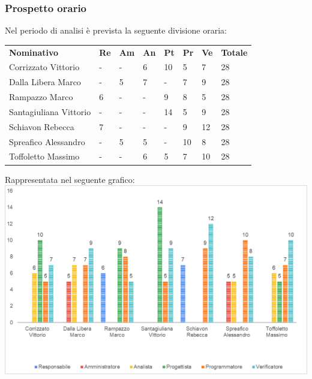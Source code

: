	\subsubsection{Prospetto orario}
	Nel periodo di analisi è prevista la seguente divisione oraria:
	\begin{longtable} {				
		>{}p{40mm}  
		>{}p{8mm}
		>{}p{8mm}
		>{}p{8mm}
		>{}p{8mm}
		>{}p{8mm}
		>{}p{8mm}
		>{}p{12mm}				
	}			
	\rowcolor{gray!50}
	\textbf{Nominativo} & \textbf{Re} & \textbf{Am} & \textbf{An} & \textbf{Pt} & \textbf{Pr} & \textbf{Ve} & \textbf{Totale}	\TBstrut \\ [2mm]
	Corrizzato Vittorio & - & - & 6 & 10 & 5 & 7 & 28 \TBstrut \\ [2mm]
	Dalla Libera Marco & - & 5 & 7 & - & 7 & 9 & 28 \TBstrut \\ [2mm]
	Rampazzo Marco & 6 & - & - & 9 & 8 & 5 & 28 \TBstrut \\ [2mm]
	Santagiuliana Vittorio & - & - & - & 14 & 5 & 9 & 28 \TBstrut \\ [2mm]
	Schiavon Rebecca & 7 & - & - & - & 9 & 12 & 28 \TBstrut \\ [2mm]
	Spreafico Alessandro & - & 5 & 5 & - & 10 & 8 & 28 \TBstrut \\ [2mm]
	Toffoletto Massimo & - & - & 6 & 5 & 7 & 10 & 28 \TBstrut \\ [2mm]
	\end{longtable}
	Rappresentata nel seguente grafico: \\
	\includegraphics[width=\linewidth]{./img/Grafici/3.png}

